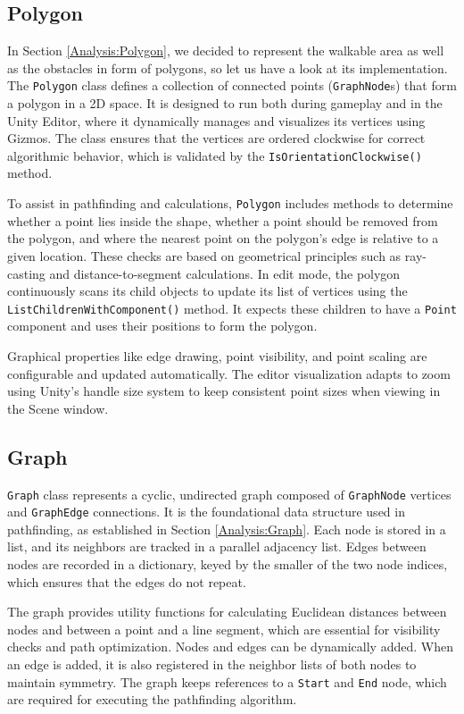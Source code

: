  
\subsection{Polygon}
In Section \ref{Analysis:Polygon}, we decided to represent the walkable area as well as the obstacles in form of polygons, so let us have a look at its implementation. The \verb|Polygon| class defines a collection of connected points (\verb|GraphNode|s) that form a polygon in a 2D space. It is designed to run both during gameplay and in the Unity Editor, where it dynamically manages and visualizes its vertices using Gizmos. The class ensures that the vertices are ordered clockwise for correct algorithmic behavior, which is validated by the \verb|IsOrientationClockwise()| method.

To assist in pathfinding and calculations, \verb|Polygon| includes methods to determine whether a point lies inside the shape, whether a point should be removed from the polygon, and where the nearest point on the polygon's edge is relative to a given location. These checks are based on geometrical principles such as ray-casting and distance-to-segment calculations. In edit mode, the polygon continuously scans its child objects to update its list of vertices using the \verb|ListChildrenWithComponent()| method. It expects these children to have a \verb|Point| component and uses their positions to form the polygon.

Graphical properties like edge drawing, point visibility, and point scaling are configurable and updated automatically. The editor visualization adapts to zoom using Unity’s handle size system to keep consistent point sizes when viewing in the Scene window.


\subsection{Graph}
\verb|Graph| class represents a cyclic, undirected graph composed of \verb|GraphNode| vertices and \verb|GraphEdge| connections. It is the foundational data structure used in pathfinding, as established in Section \ref{Analysis:Graph}. Each node is stored in a list, and its neighbors are tracked in a parallel adjacency list. Edges between nodes are recorded in a dictionary, keyed by the smaller of the two node indices, which ensures that the edges do not repeat.

The graph provides utility functions for calculating Euclidean distances between nodes and between a point and a line segment, which are essential for visibility checks and path optimization. Nodes and edges can be dynamically added. When an edge is added, it is also registered in the neighbor lists of both nodes to maintain symmetry. The graph keeps references to a \verb|Start| and \verb|End| node, which are required for executing the pathfinding algorithm.


